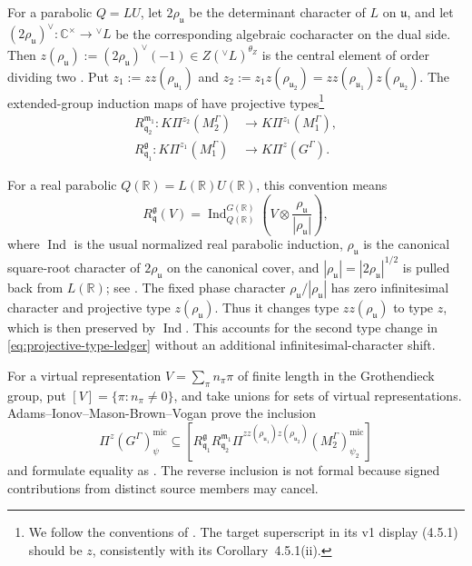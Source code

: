 \documentclass[10pt]{amsart}
\numberwithin{equation}{section}
\theoremstyle{plain}
\theoremstyle{definition}
\theoremstyle{remark}
\newcommand{\CC}{\mathbb C}
\newcommand{\RR}{\mathbb R}
\newcommand{\fg}{\mathfrak g}
\newcommand{\fm}{\mathfrak m}
\newcommand{\fq}{\mathfrak q}
\newcommand{\fu}{\mathfrak u}
\newcommand{\vL}{{}^{\vee}L}
\newcommand{\mic}{\mathrm{mic}}
\begin{document}
For a parabolic $Q=LU$, let $2\rho_{\fu}$ be the determinant character
of $L$ on $\fu$, and let $
 (2\rho_{\fu})^\vee\colon\CC^\times\longrightarrow\vL$
be the corresponding algebraic cocharacter on the dual side. Then $
 z(\rho_{\fu}):=(2\rho_{\fu})^\vee(-1)\in Z(\vL)^{\theta_Z}$
is the central element of order dividing two
\cite[(2.5.1)--(2.5.2)]{AIMV26}.
Put $z_1:=zz(\rho_{\fu_1})$ and
$z_2:=z_1z(\rho_{\fu_2})=zz(\rho_{\fu_1})z(\rho_{\fu_2})$. The extended-group
induction maps of \cite[(2.6.1)]{AIMV26} have projective types\footnote{We
follow the conventions of \cite[Sections~2.5--2.6]{AIMV26}. The target
superscript in its v1 display (4.5.1) should be $z$, consistently with
its Corollary~4.5.1(ii).}
\begin{equation}\label{eq:projective-type-ledger}
 \begin{split}
 R_{\fq_2}^{\fm_1}\colon
 K\Pi^{z_2}(M_2^\Gamma)&\longrightarrow K\Pi^{z_1}(M_1^\Gamma),\\
 R_{\fq_1}^{\fg}\colon
 K\Pi^{z_1}(M_1^\Gamma)&\longrightarrow K\Pi^z(G^\Gamma).
\end{split}
\end{equation}

For a real parabolic $Q(\RR)=L(\RR)U(\RR)$, this convention means
\begin{equation}\label{eq:real-induction-normalization}
 R_{\fq}^{\fg}(V)
 =\operatorname{Ind}_{Q(\RR)}^{G(\RR)}
   \left(V\otimes\frac{\rho_{\fu}}{|\rho_{\fu}|}\right),
\end{equation}
where $\operatorname{Ind}$ is the usual normalized real parabolic
induction, $\rho_{\fu}$ is the canonical square-root character of
$2\rho_{\fu}$ on the canonical cover, and
$|\rho_{\fu}|=|2\rho_{\fu}|^{1/2}$ is pulled back from $L(\RR)$;
see \cite[Section~2.5.1]{AIMV26}.
The fixed phase character $\rho_{\fu}/|\rho_{\fu}|$ has zero
infinitesimal character and projective type $z(\rho_{\fu})$.
Thus it changes type $zz(\rho_{\fu})$ to type $z$, which is then
preserved by $\operatorname{Ind}$. This accounts for the second
type change in \eqref{eq:projective-type-ledger} without an additional
infinitesimal-character shift.

For a virtual representation $V=\sum_\pi n_\pi\pi$ of finite length in the
Grothendieck group, put $[V]=\{\pi:n_\pi\neq0\}$, and take unions for sets
of virtual representations.
Adams--Ionov--Mason-Brown--Vogan prove the inclusion
\cite[Theorem~4.6.1(iii)]{AIMV26}
\begin{equation}\label{eq:intro-known}
  \Pi^z(G^\Gamma)^{\mic}_{\psi}
  \subseteq
  \left[
  R_{\fq_1}^{\fg}R_{\fq_2}^{\fm_1}
  \Pi^{zz(\rho_{\fu_1})z(\rho_{\fu_2})}(M_2^\Gamma)^{\mic}_{\psi_2}
  \right]
\end{equation}
and formulate equality as \cite[Conjecture~4.6.5]{AIMV26}. The reverse
inclusion is not formal because signed contributions from distinct source
members may cancel.
\end{document}
